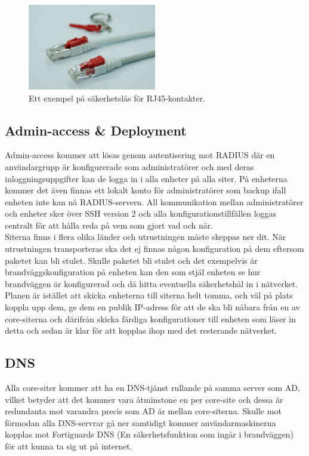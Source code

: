     \begin{figure}[htb]
        \centering
        \includegraphics[width=0.5\textwidth]{pics/portsec.jpg}
        \caption[RJ45-lås]{Ett exempel på säkerhetslås för RJ45-kontakter.}
        \label{fig:rj45-caps}
    \end{figure}

\subsection{Admin-access \& Deployment}
    Admin-access kommer att lösas genom autentisering mot RADIUS där en användargrupp är konfigurerade som administratörer och med deras inloggningsuppgifter kan de logga in i alla enheter på alla siter. På enheterna kommer det även finnas ett lokalt konto för administratörer som backup ifall enheten inte kan nå RADIUS-servern. All kommunikation mellan administratörer och enheter sker över SSH version 2 och alla konfigurationstillfällen loggas centralt för att hålla reda på vem som gjort vad och när. \\
    
    \noindent Siterna finns i flera olika länder och utrustningen måste skeppas ner dit. När utrustningen transporteras ska det ej finnas någon konfiguration på dem eftersom paketet kan bli stulet. Skulle paketet bli stulet och det exempelvis är brandväggskonfiguration på enheten kan den som stjäl enheten se hur brandväggen är konfigurerad och då hitta eventuella säkerhetshål in i nätverket. Planen är istället att skicka enheterna till siterna helt tomma, och väl på plats koppla upp dem, ge dem en publik IP-adress för att de ska bli nåbara från en av core-siterna och därifrån skicka färdiga konfigurationer till enheten som läser in detta och sedan är klar för att kopplas ihop med det resterande nätverket.

\subsection{DNS}
    Alla core-siter kommer att ha en DNS-tjänst rullande på samma server som AD, vilket betyder att det kommer vara åtminstone en per core-site och dessa är redundanta mot varandra precis som AD är mellan core-siterna. Skulle mot förmodan alla DNS-servrar gå ner samtidigt kommer användarmaskinerna kopplas mot Fortiguards DNS (En säkerhetsfunktion som ingår i brandväggen) för att kunna ta sig ut på internet.

